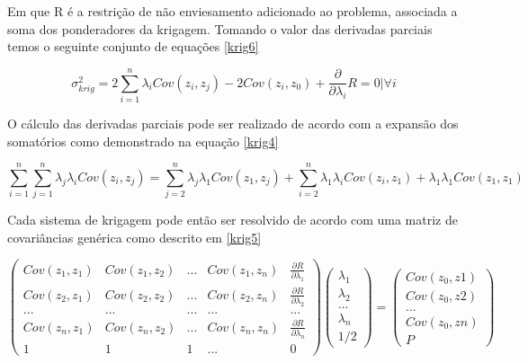 Em que R é a restrição de não enviesamento adicionado ao problema, associada a soma dos ponderadores da krigagem. Tomando o valor das derivadas parciais temos o seguinte conjunto de equações \eqref{krig6}

 \begin{equation}\label{krig6}
 \sigma ^2_{krig} =  2\sum_{i=1}^{n} \lambda_{i}  Cov(z_{i},z_{j}) -2Cov(z_{i},z_{0})  + \frac{\partial }{\partial \lambda _{i}} R = 0 | \forall i
 \end{equation}

O cálculo das derivadas parciais pode ser realizado de acordo com a expansão dos somatórios como demonstrado na equação \eqref{krig4}

\begin{equation}\label{krig7}
 \sum_{i=1}^{n}  \sum_{j=1}^{n} \lambda_{j} \lambda_{i} Cov(z_{i},z_{j}) =   \sum_{j=2}^{n} \lambda_{j} \lambda_{1} Cov(z_{1},z_{j})  + \sum_{i=2}^{n} \lambda_{1} \lambda_{i}  Cov(z_{i},z_{1})  + \lambda_{1}\lambda_{1} Cov(z_{1},z_{1})
\end{equation}

Cada sistema de krigagem pode então ser resolvido de acordo com uma matriz de covariâncias genérica como descrito em \eqref{krig5}

\begin{equation}\label{krig8}
\begin{pmatrix}
Cov(z_{1},z_{1})&Cov(z_{1},z_{2})& ... & Cov(z_{1},z_{n})& \frac{\partial R }{\partial \lambda _{1}}\\ 
Cov(z_{2},z_{1})&Cov(z_{2},z_{2})& ... & Cov(z_{2},z_{n})& \frac{\partial R }{\partial \lambda _{2}}\\ 
...&...& ...&... & ...\\
Cov(z_{n},z_{1})&Cov(z_{n},z_{2})& ... & Cov(z_{n},z_{n})& \frac{\partial R }{\partial \lambda _{n}}\\
1&1& 1&...& 0
\end{pmatrix} 
\begin{pmatrix}
\lambda _{1}\\ 
\lambda _{2}\\ 
...\\ 
\lambda _{n}\\
1/2
\end{pmatrix}=\begin{pmatrix}
Cov(z_{0}, z{1})\\ 
Cov(z_{0}, z{2})\\  
...\\
Cov(z_{0}, z{n})\\
P
\end{pmatrix}
\end{equation}

